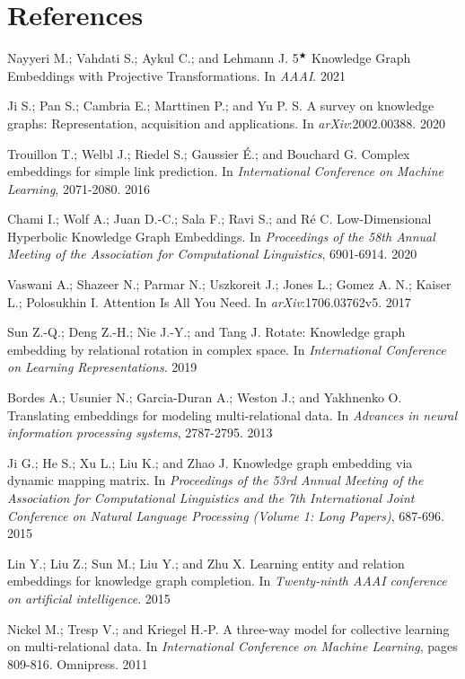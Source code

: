 \documentclass[9pt]{ctexart}
\theoremstyle{definition}
\begin{document}
\section{References}
\hypertarget{Nay21}{Nayyeri M.; Vahdati S.; Aykul C.; and Lehmann J. 5$^\bigstar$ Knowledge Graph Embeddings with Projective Transformations. In \textit{AAAI}. 2021} 

\hypertarget{JiS20}{Ji S.; Pan S.; Cambria E.; Marttinen P.; and Yu P. S. A survey on knowledge graphs: Representation, acquisition and applications. In \textit{arXiv}:2002.00388. 2020} 

\hypertarget{Tro16}{Trouillon T.; Welbl J.; Riedel S.; Gaussier É.; and Bouchard G. Complex embeddings for simple link prediction. In \textit{International Conference on Machine Learning}, 2071-2080. 2016} 

\hypertarget{Cha20}{Chami I.; Wolf A.; Juan D.-C.; Sala F.; Ravi S.; and Ré C. Low-Dimensional Hyperbolic Knowledge Graph Embeddings. In \textit{Proceedings of the 58th Annual Meeting of the Association for Computational Linguistics}, 6901-6914. 2020} 

\hypertarget{Vas17}{Vaswani A.; Shazeer N.; Parmar N.; Uszkoreit J.; Jones L.; Gomez A. N.; Kaiser L.; Polosukhin I. Attention Is All You Need. In \textit{arXiv}:1706.03762v5. 2017} 

\hypertarget{Sun19}{Sun Z.-Q.; Deng Z.-H.; Nie J.-Y.; and Tang J. Rotate: Knowledge graph embedding by relational rotation in complex space. In \textit{International Conference on Learning Representations}. 2019} 

\hypertarget{Bor13}{Bordes A.; Usunier N.; Garcia-Duran A.; Weston J.; and Yakhnenko O. Translating embeddings for modeling multi-relational data. In \textit{Advances in neural information processing systems}, 2787-2795. 2013} 

\hypertarget{Jie15}{Ji G.; He S.; Xu L.; Liu K.; and Zhao J. Knowledge graph embedding via dynamic mapping matrix. In \textit{Proceedings of the 53rd Annual Meeting of the Association for Computational Linguistics and the 7th International Joint Conference on Natural Language Processing (Volume 1: Long Papers)}, 687-696. 2015} 

\hypertarget{Lin15}{Lin Y.; Liu Z.; Sun M.; Liu Y.; and Zhu X. Learning entity and relation embeddings for knowledge graph completion. In \textit{Twenty-ninth AAAI conference on artificial intelligence}. 2015} 

\hypertarget{Nic11}{Nickel M.; Tresp V.; and Kriegel H.-P. A three-way model for collective learning on multi-relational data. In \textit{International Conference on Machine Learning}, pages 809-816. Omnipress. 2011} 
\end{document}
